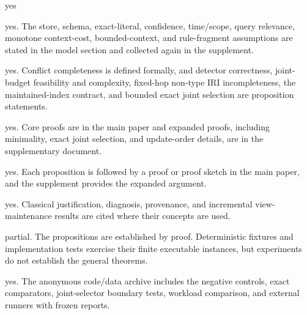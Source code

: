 \documentclass[letterpaper]{article}
\begin{document}
\begin{itemize}

yes

        \begin{itemize}
	
		yes. The store, schema, exact-literal, confidence, time/scope, query
		relevance, monotone context-cost, bounded-context, and rule-fragment
		assumptions are stated in the model section and collected again in the
		supplement.

		yes. Conflict completeness is defined formally, and detector
		correctness, joint-budget feasibility and complexity, fixed-hop
		non-type IRI incompleteness, the maintained-index contract, and bounded exact joint
		selection are proposition statements.

		yes. Core proofs are in the main paper and expanded proofs, including
		minimality, exact joint selection, and update-order details, are in the
		supplementary document.

		yes. Each proposition is followed by a proof or proof sketch in the main
		paper, and the supplement provides the expanded argument.

		yes. Classical justification, diagnosis, provenance, and incremental
		view-maintenance results are cited where their concepts are used.

		partial. The propositions are established by proof. Deterministic
		fixtures and implementation tests exercise their finite executable
		instances, but experiments do not establish the general theorems.

		yes. The anonymous code/data archive includes the negative controls,
		exact comparators, joint-selector boundary tests, workload comparison,
		and external runners with frozen reports.
	
	\end{itemize}
\end{itemize}
\end{document}

